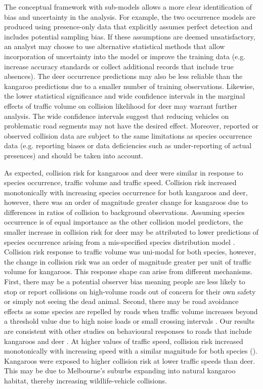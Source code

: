 The conceptual framework with sub-models allows a more clear identification of bias and uncertainty in the analysis.  For example, the two occurrence models are produced using presence-only data that explicitly assumes perfect detection and includes potential sampling bias.  If these assumptions are deemed unsatisfactory, an analyst may choose to use alternative statistical methods that allow incorporation of uncertainty into the model \citep[see][]{dora14} or improve the training data (e.g. increase accuracy standards or collect additional records that include true absences).  The deer occurrence predictions may also be less reliable than the kangaroo predictions due to a smaller number of training observations.  Likewise, the lower statistical significance and wide confidence intervals in the marginal effects of traffic volume on collision likelihood for deer may warrant further analysis. The wide confidence intervals suggest that reducing vehicles on problematic road segments may not have the desired effect.  Moreover, reported or observed collision data are subject to the same limitations as species occurrence data (e.g. reporting biases or data deficiencies such as under-reporting of actual presences) and should be taken into account.

As expected, collision risk for kangaroos and deer were similar in response to species occurrence, traffic volume and traffic speed.  Collision risk increased monotonically with increasing species occurrence for both kangaroos and deer, however, there was an order of magnitude greater change for kangaroos due to differences in ratios of collision to background observations.  Assuming species occurrence is of equal importance as the other collision model predictors, the smaller increase in collision risk for deer may be attributed to lower predictions of species occurrence arising from a mis-specified species distribution model \citep[see][]{guil15}.  Collision risk response to traffic volume was uni-modal for both species, however, the change in collision risk was an order of magnitude greater per unit of traffic volume for kangaroos.  This response shape can arise from different mechanisms.  First, there may be a potential observer bias meaning people are less likely to stop or report collisions on high-volume roads out of concern for their own safety or simply not seeing the dead animal.  Second, there may be road avoidance effects as some species are repelled by roads when traffic volume increases beyond a threshold value due to high noise loads or small crossing intervals \citep[see][]{vanl04,seil05,gagn07}.  Our results are consistent with other studies on behavioural responses to roads that include kangaroos and deer \citep[see][]{jaco16}.  At higher values of traffic speed, collision risk increased monotonically with increasing speed with a similar magnitude for both species ().  Kangaroos were exposed to higher collision risk at lower traffic speeds than deer.  This may be due to Melbourne's suburbs expanding into natural kangaroo habitat, thereby increasing wildlife-vehicle collisions.

